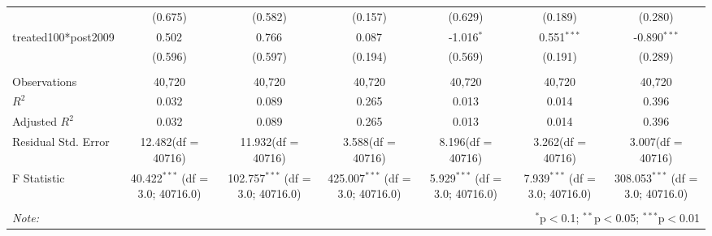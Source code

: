 \documentclass[12pt]{article}
\begin{document}
\begin{table}[!htbp]
\begin{tabular}{@{\extracolsep{5pt}}lcccccc}
  & (0.675) & (0.582) & (0.157) & (0.629) & (0.189) & (0.280) \\
 treated100*post2009 & 0.502$^{}$ & 0.766$^{}$ & 0.087$^{}$ & -1.016$^{*}$ & 0.551$^{***}$ & -0.890$^{***}$ \\
  & (0.596) & (0.597) & (0.194) & (0.569) & (0.191) & (0.289) \\
\hline \\[-1.8ex]
 Observations & 40,720 & 40,720 & 40,720 & 40,720 & 40,720 & 40,720 \\
 $R^2$ & 0.032 & 0.089 & 0.265 & 0.013 & 0.014 & 0.396 \\
 Adjusted $R^2$ & 0.032 & 0.089 & 0.265 & 0.013 & 0.014 & 0.396 \\
 Residual Std. Error & 12.482(df = 40716) & 11.932(df = 40716) & 3.588(df = 40716) & 8.196(df = 40716) & 3.262(df = 40716) & 3.007(df = 40716)  \\
 F Statistic & 40.422$^{***}$ (df = 3.0; 40716.0) & 102.757$^{***}$ (df = 3.0; 40716.0) & 425.007$^{***}$ (df = 3.0; 40716.0) & 5.929$^{***}$ (df = 3.0; 40716.0) & 7.939$^{***}$ (df = 3.0; 40716.0) & 308.053$^{***}$ (df = 3.0; 40716.0) \\
\hline
\hline \\[-1.8ex]
\textit{Note:} & \multicolumn{6}{r}{$^{*}$p$<$0.1; $^{**}$p$<$0.05; $^{***}$p$<$0.01} \\
\end{tabular}
\end{table}
\end{document}
